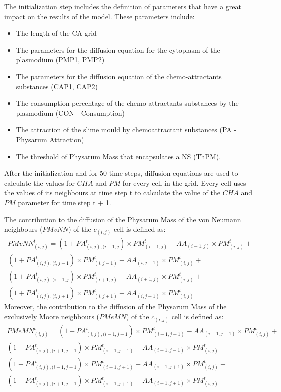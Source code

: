 \par
The initialization step includes the definition of parameters that have a great impact on the results of the model. These parameters include:
\begin{itemize}
	\item The length of the CA grid
	\item The parameters for the diffusion equation for the cytoplasm of the plasmodium (PMP1, PMP2)
	\item The parameters for the diffusion equation of the chemo-attractants substances (CAP1, CAP2)
	\item The consumption percentage of the chemo-attractants substances by the plasmodium (CON - Consumption)
	\item The attraction of the slime mould by chemoattractant substances (PA - Physarum Attraction)
	\item The threshold of Physarum Mass that encapsulates a NS (ThPM).
\end{itemize}

\par
After the initialization and for 50 time steps, diffusion equations are used to calculate the values for $CHA$ and $PM$ for every cell in the grid. Every cell uses the values of its neighbours at time step t to calculate the value of the $CHA$ and $PM$ parameter for time step t + 1. 

\par
The contribution to the diffusion of the Physarum Mass of the von Neumann neighbours ($PMvNN$) of the $c_{(i,j)}$ cell is defined as:
\begin{equation}
\begin{split}
PMvNN^t_{(i, j)} = 
(1 + PA^t_{(i, j),(i-1, j}) \times PM^t_{(i-1, j)} - AA_{(i-1, j)} \times PM^t_{(i, j)} +
\\(1 + PA^t_{(i, j),(i, j-1}) \times PM^t_{(i, j-1)} - AA_{(i, j-1)} \times PM^t_{(i, j)} +
\\(1 + PA^t_{(i, j),(i+1, j}) \times PM^t_{(i+1, j)} - AA_{(i+1, j)} \times PM^t_{(i, j)}  +
\\(1 + PA^t_{(i, j),(i, j+1}) \times PM^t_{(i, j+1)} - AA_{(i, j+1)} \times PM^t_{(i, j)}
\end{split}
\end{equation}
Moreover, the contribution to the diffusion of the Physarum Mass of the exclusively Moore neighbours ($PMeMN$) of the $c_{(i,j)}$ cell is defined as:
\begin{equation}
\begin{split}
PMeMN^t_{(i, j)} = 
(1 + PA^t_{(i, j),(i-1, j-1}) \times PM^t_{(i-1, j-1)} - AA_{(i-1, j-1)} \times PM^t_{(i, j)} +
\\(1 + PA^t_{(i, j),(i+1, j-1}) \times PM^t_{(i+1, j-1)} - AA_{(i+1, j-1)} \times PM^t_{(i, j)} +
\\(1 + PA^t_{(i, j),(i-1, j+1}) \times PM^t_{(i-1, j+1)} - AA_{(i-1, j+1)} \times PM^t_{(i, j)}  +
\\(1 + PA^t_{(i, j),(i+1, j+1}) \times PM^t_{(i+1, j+1)} - AA_{(i+1, j+1)} \times PM^t_{(i, j)}
\end{split}
\end{equation}

